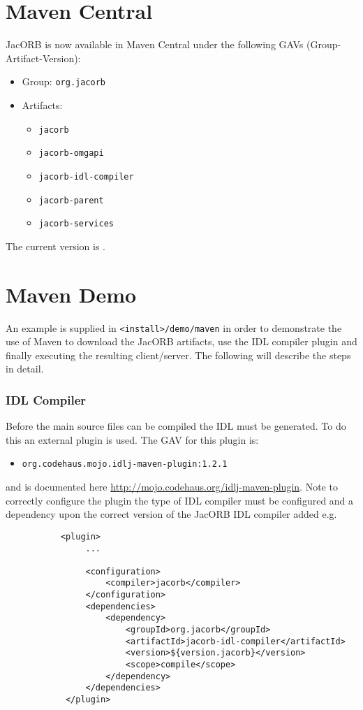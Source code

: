 
\section{Maven Central}

JacORB is now available in Maven Central under the following GAVs (Group-Artifact-Version):

\begin{itemize}
\item Group: \texttt{org.jacorb}
\item Artifacts:
  \begin{itemize}
    \item \texttt{jacorb}
    \item \texttt{jacorb-omgapi}
    \item \texttt{jacorb-idl-compiler}
    \item \texttt{jacorb-parent}
    \item \texttt{jacorb-services}
  \end{itemize}
\end{itemize}

The current version is \JacORBVersion.


\section{Maven Demo}

An example is supplied in \texttt{<install>/demo/maven} in order to demonstrate the use of Maven to download the JacORB artifacts, use the IDL compiler plugin and finally executing the resulting client/server. The following will describe the steps in detail.

\subsubsection{IDL Compiler}
Before the main source files can be compiled the IDL must be generated. To do this an external plugin is used. The GAV for this plugin is:
\begin{itemize}
\item \texttt{org.codehaus.mojo.idlj-maven-plugin:1.2.1}
\end{itemize}

and is documented here \href{http://mojo.codehaus.org/idlj-maven-plugin}{http://mojo.codehaus.org/idlj-maven-plugin}. Note to correctly configure the plugin the type of IDL compiler must be configured and a dependency upon the correct version of the JacORB IDL compiler added e.g.
\begin{verbatim}
           <plugin>
                ...

                <configuration>
                    <compiler>jacorb</compiler>
                </configuration>
                <dependencies>
                    <dependency>
                        <groupId>org.jacorb</groupId>
                        <artifactId>jacorb-idl-compiler</artifactId>
                        <version>${version.jacorb}</version>
                        <scope>compile</scope>
                    </dependency>
                </dependencies>
            </plugin>
\end{verbatim}

